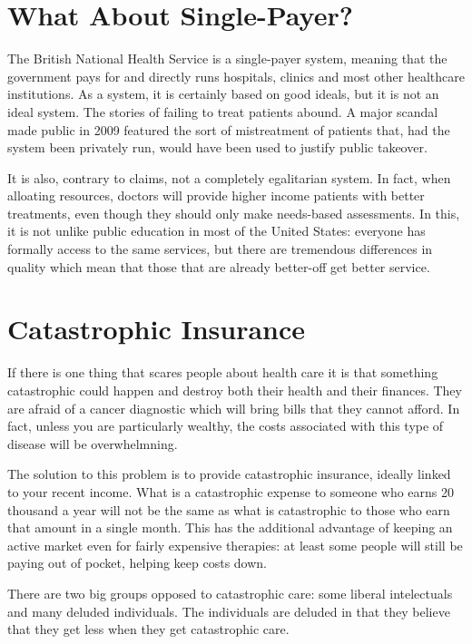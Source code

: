 \section{What About Single-Payer?}

The British National Health Service is a single-payer system, meaning that the
government pays for and directly runs hospitals, clinics and most other
healthcare institutions. As a system, it is certainly based on good ideals, but
it is not an ideal system. The stories of failing to treat patients abound. A
major scandal made public in 2009 featured the sort of mistreatment of patients
that, had the system been privately run, would have been used to justify public
takeover.

It is also, contrary to claims, not a completely egalitarian system. In fact,
when alloating resources, doctors will provide higher income patients with
better treatments, even though they should only make needs-based
assessments. In this, it is not
unlike public education in most of the United States: everyone has formally
access to the same services, but there are tremendous differences in quality
which mean that those that are already better-off get better service.

\section{Catastrophic Insurance}

If there is one thing that scares people about health care it is that something
catastrophic could happen and destroy both their health and their finances.
They are afraid of a cancer diagnostic which will bring bills that they cannot
afford. In fact, unless you are particularly wealthy, the costs associated with
this type of disease will be overwhelmning.

The solution to this problem is to provide catastrophic insurance, ideally
linked to your recent income. What is a catastrophic expense to someone who
earns 20 thousand a year will not be the same as what is catastrophic to those
who earn that amount in a single month. This has the additional advantage of
keeping an active market even for fairly expensive therapies: at least some
people will still be paying out of pocket, helping keep costs down.

There are two big groups opposed to catastrophic care: some liberal
intelectuals and many deluded individuals. The individuals are deluded in that
they believe that they get less when they get catastrophic care.

